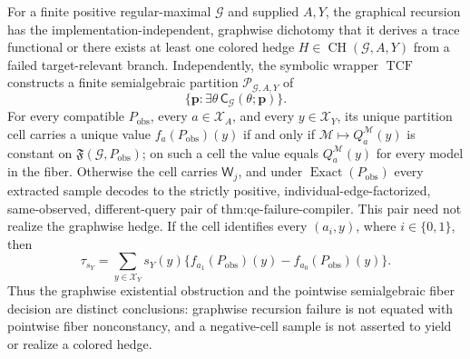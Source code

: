 For a finite positive regular-maximal \(\mathcal G\) and supplied \(A,Y\), the graphical recursion has the implementation-independent, graphwise dichotomy that it derives a trace functional or there exists at least one colored hedge \(H\in\operatorname{CH}(\mathcal G,A,Y)\) from a failed target-relevant branch. Independently, the symbolic wrapper \(\operatorname{TCF}\) constructs a finite semialgebraic partition \(\mathscr P_{\mathcal G,A,Y}\) of
\[
\{\mathbf p:\exists\theta\,\mathsf C_{\mathcal G}(\theta;\mathbf p)\}.
\]
For every compatible \(P_{\mathrm{obs}}\), every \(a\in\mathcal X_A\), and every \(y\in\mathcal X_Y\), its unique partition cell carries a unique value \(f_a(P_{\mathrm{obs}})(y)\) if and only if \(\mathcal M\mapsto Q_a^{\mathcal M}(y)\) is constant on \(\mathfrak F(\mathcal G,P_{\mathrm{obs}})\); on such a cell the value equals \(Q_a^{\mathcal M}(y)\) for every model in the fiber. Otherwise the cell carries \(\mathsf W_j\), and under \(\operatorname{Exact}(P_{\mathrm{obs}})\) every extracted sample decodes to the strictly positive, individual-edge-factorized, same-observed, different-query pair of \(\text{thm:qe-failure-compiler}\). This pair need not realize the graphwise hedge. If the cell identifies every \((a_i,y)\), where \(i\in\{0,1\}\), then
\[
\tau_{s_Y}=\sum_{y\in\mathcal X_Y}s_Y(y)\{f_{a_1}(P_{\mathrm{obs}})(y)-f_{a_0}(P_{\mathrm{obs}})(y)\}.
\]
Thus the graphwise existential obstruction and the pointwise semialgebraic fiber decision are distinct conclusions: graphwise recursion failure is not equated with pointwise fiber nonconstancy, and a negative-cell sample is not asserted to yield or realize a colored hedge.